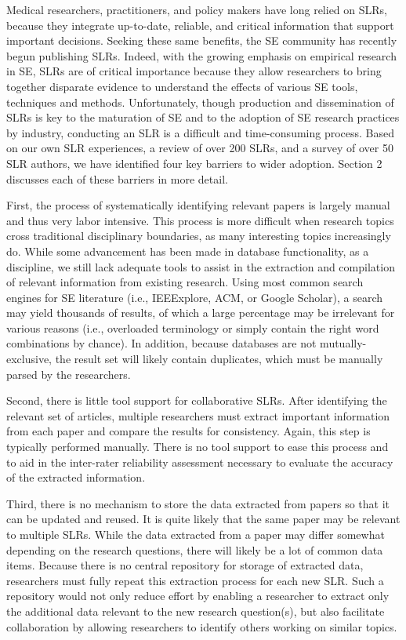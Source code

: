 Medical researchers, practitioners, and policy makers have long relied on SLRs, because they integrate up-to-date, reliable, and critical information that support important decisions. Seeking these same benefits, the SE community has recently begun publishing SLRs. Indeed, with the growing emphasis on empirical research in SE, SLRs are of critical importance because they allow researchers to bring together disparate evidence to understand the effects of various SE tools, techniques and methods. Unfortunately, though production and dissemination of SLRs is key to the maturation of SE and to the adoption of SE research practices by industry, conducting an SLR is a difficult and time-consuming process. Based on our own SLR experiences, a review of over 200 SLRs, and a survey of over 50 SLR authors, we have identified four key barriers to wider adoption. Section 2 discusses each of these barriers in more detail.

First, the process of systematically identifying relevant papers is largely manual and thus very labor intensive. This process is more difficult when research topics cross traditional disciplinary boundaries, as many interesting topics increasingly do. While some advancement has been made in database functionality, as a discipline, we still lack adequate tools to assist in the extraction and compilation of relevant information from existing research. Using most common search engines for SE literature (i.e., IEEExplore, ACM, or Google Scholar), a search may yield thousands of results, of which a large percentage may be irrelevant for various reasons (i.e., overloaded terminology or simply contain the right word combinations by chance). In addition, because databases are not mutually-exclusive, the result set will likely contain duplicates, which must be manually parsed by the researchers.

Second, there is little tool support for collaborative SLRs. After identifying the relevant set of articles, multiple researchers must extract important information from each paper and compare the results for consistency. Again, this step is typically performed manually. There is no tool support to ease this process and to aid in the inter-rater reliability assessment necessary to evaluate the accuracy of the extracted information.

Third, there is no mechanism to store the data extracted from papers so that it can be updated and reused. It is quite likely that the same paper may be relevant to multiple SLRs. While the data extracted from a paper may differ somewhat depending on the research questions, there will likely be a lot of common data items. Because there is no central repository for storage of extracted data, researchers must fully repeat this extraction process for each new SLR. Such a repository would not only reduce effort by enabling a researcher to extract only the additional data relevant to the new research question(s), but also facilitate collaboration by allowing researchers to identify others working on similar topics.

